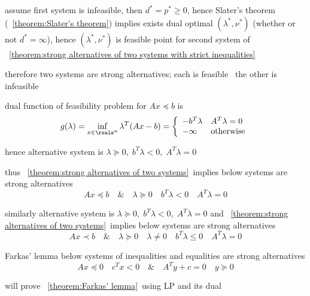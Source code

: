 \documentclass[17pt,landscape]{foils}
\begin{document}
{\vitem
	assume first system
	is infeasible,
	then $d^\ast = p^\ast\geq0$,
	hence
	Slater's theorem (\theoremname~\ref{theorem:Slater's theorem})
	implies exists dual optimal $(\lambda^\ast,\nu^\ast)$ (whether or not $d^\ast=\infty$),
	hence $(\lambda^\ast,\nu^\ast)$ is feasible point for second system
	of \theoremname~\ref{theorem:strong alternatives of two systems with strict inequalities}\

\vitem
	therefore
	two systems are strong alternatives;
	each is feasible \iaoi\ the other is infeasible
\eit



\bit
\item
	dual function of feasibility problem for $Ax\preceq b$
	is
	$$
		g(\lambda) = \inf_{x\in\reals^n} \lambda^T(Ax-b)
		=
		\left\{
		\begin{array}{ll}
			-b^T \lambda & A^T\lambda = 0
			\\
			-\infty & \mbox{otherwise}
		\end{array}
		\right.
	$$

\vitem
	hence
	alternative system is $\lambda\succeq0,\;b^T\lambda <0,\; A^T\lambda=0$

\vitem
	thus \theoremname~\ref{theorem:strong alternatives of two systems}\
	implies below systems are strong alternatives
	$$
		Ax \preceq b
		\quad\&\quad
		\lambda\succeq0 \quad b^T\lambda <0 \quad A^T\lambda=0
	$$

\vitem
	similarly
	alternative system is $\lambda\succeq0,\;b^T\lambda <0,\; A^T\lambda=0$
	and \theoremname~\ref{theorem:strong alternatives of two systems}\
	implies below systems are strong alternatives
	$$
		Ax \prec b
		\quad\&\quad
		\lambda\succeq0 \quad \lambda \neq 0 \quad b^T\lambda \leq 0 \quad A^T\lambda=0
	$$
\eit
\vfill



\begin{mytheorem}{Farkas' lemma}
	below systems of inequalities and equalities are strong alternatives
	$$
		Ax\preceq 0 \quad c^T x < 0
		\quad \& \quad
		A^T y + c = 0
		\quad
		y \succeq 0
	$$
\end{mytheorem}

\bit
\item
	will prove \theoremname~\ref{theorem:Farkas' lemma}\
	using LP and its dual

}
\end{document}
